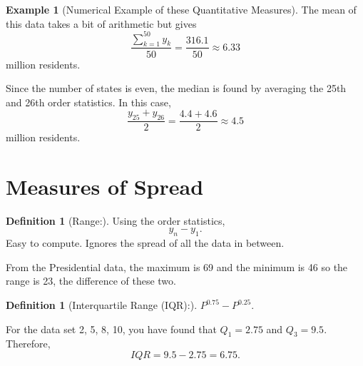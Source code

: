 \documentclass[10pt,]{book}
\theoremstyle{plain}
\theoremstyle{definition}
\newtheorem{definition}[theorem]{Definition}
\theoremstyle{definition}
\newtheorem{example}[theorem]{Example}
\theoremstyle{definition}
\numberwithin{equation}{section}
\begin{document}
\begin{example}[Numerical Example of these Quantitative Measures]
The mean of this data takes a bit of arithmetic but gives
\begin{equation*}\frac{\sum_{k=1}^{50} y_k }{50} = \frac{316.1}{50} \approx 6.33\end{equation*}
million residents.
%
\par

Since the number of states is even, the median is found by averaging the 25th and 26th order statistics. In this case, 
\begin{equation*}\frac{y_{25}+y_{26}}{2}=\frac{4.4+4.6}{2} \approx 4.5 \end{equation*} million residents.
%
\end{example}
\typeout{************************************************}
\typeout{************************************************}
\section[Measures of Spread]{Measures of Spread}\label{section-8}
\begin{definition}[Range:]\label{definition-12}
Using the order statistics, \begin{equation*}y_n - y_1.\end{equation*}  
Easy to compute. Ignores the spread of all the data in between.
%
\end{definition}
From the Presidential data, the maximum is 69 and the minimum is 46 so the range is 23, the difference of these two. %
\begin{definition}[Interquartile Range (IQR):]\label{definition-13}
\(P^{0.75} - P^{0.25}\). 
%
\end{definition}
\par

For the data set {2, 5, 8, 10}, you have found that \(Q_1 = 2.75\) and \(Q_3 = 9.5\). Therefore, \begin{equation*}IQR = 9.5 - 2.75 = 6.75.\end{equation*}
%
\par
\end{document}
